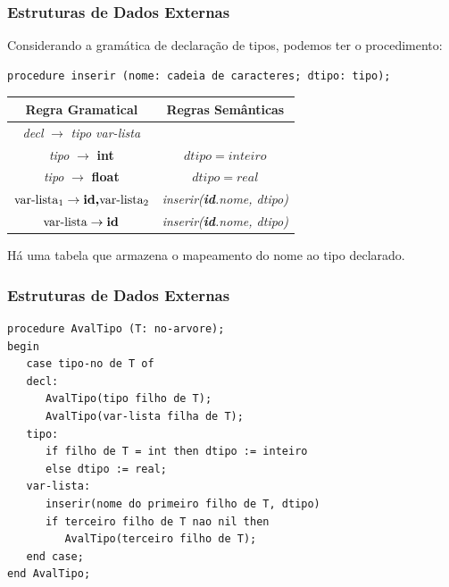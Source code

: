 \documentclass[table]{beamer}
\begin{document}
\begin{frame}[fragile]
   \frametitle{Estruturas de Dados Externas}
   Considerando a gramática de declaração de tipos, podemos ter o procedimento: \\
   \footnotesize
   \begin{verbatim}
procedure inserir (nome: cadeia de caracteres; dtipo: tipo);
   \end{verbatim}
   \begin{table}
      \begin{tabular}{cc}
      Regra Gramatical & Regras Semânticas \\
      \hline 
      \textit{decl} $\rightarrow$ \textit{tipo var-lista} &  \\    
      \textit{tipo} $\rightarrow$ \textbf{int} & $dtipo = inteiro$ \\
      \textit{tipo} $\rightarrow$ \textbf{float} & $dtipo = real$ \\
      ${\text{var-lista}}_{1} \rightarrow \text{\textbf{id,}} {\text{var-lista}}_{2}$ & \textit{inserir(\textbf{id}.nome, dtipo)} \\
      $\text{var-lista} \rightarrow \text{\textbf{id}}$ & \textit{inserir(\textbf{id}.nome, dtipo)} \\
      \end{tabular}   
   \end{table}  
   \normalsize 
   Há uma tabela que armazena o mapeamento do nome ao tipo declarado.
\end{frame}

\begin{frame}[fragile]
   \frametitle{Estruturas de Dados Externas}
   \begin{verbatim}
procedure AvalTipo (T: no-arvore);
begin
   case tipo-no de T of
   decl:
      AvalTipo(tipo filho de T);
      AvalTipo(var-lista filha de T);
   tipo:
      if filho de T = int then dtipo := inteiro
      else dtipo := real;
   var-lista:
      inserir(nome do primeiro filho de T, dtipo)
      if terceiro filho de T nao nil then
         AvalTipo(terceiro filho de T);
   end case;
end AvalTipo;
   \end{verbatim}
 \end{frame}
\end{document}
